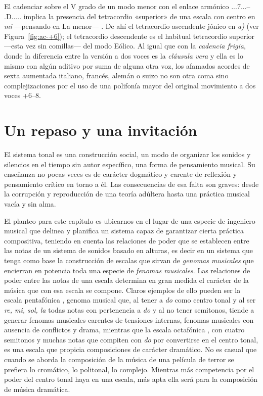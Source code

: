 \documentclass[a4paper,12pt]{article}
\begin{document}
\begin{multicols}{2}
El cadenciar sobre el V grado de un modo menor con el enlace armónico \acorde.\DD..7...-- \acorde.D..... implica la presencia del tetracordio «superior» de una escala con centro en \emph{mi} ---pensando en La menor--- . De ahí el tetracordio ascendente jónico en \emph{a)} (ver Figura~\ref{fig:ac-+6}); el tetracordio descendente  es el habitual tetracordio superior ---esta vez sin comillas--- del modo Eólico. Al igual que con la \emph{cadencia frigia}, donde la diferencia entre la versión a dos voces es la \emph{cláusula vera} y ella es lo mismo con algún aditivo por suma de alguna otra voz, los afamados acordes de sexta aumentada italiano, francés, alemán o suizo no son otra coma sino complejizaciones por el uso de una polifonía mayor del original movimiento a dos voces +6--8.

\section{Un repaso y una invitación}\label{sec:repaso-invitacion}
El sistema tonal es una construcción social, un modo de organizar los sonidos y silencios en el tiempo sin autor específico, una forma de pensamiento musical. Su enseñanza no pocas veces es de carácter dogmático y carente de reflexión y pensamiento crítico en torno a él. Las consecuencias de esa falta son graves: desde la corrupción y reproducción de una teoría adúltera hasta una práctica musical vacía y sin alma.

El planteo para este capítulo es ubicarnos en el lugar de una especie de ingeniero musical que delinea y planifica un sistema capaz de garantizar cierta práctica compositiva, teniendo en cuenta las relaciones de poder que se establecen entre las notas de un sistema de sonidos basado en alturas, es decir en un sistema que tenga como base la construcción de escalas que sirvan de \emph{genomas musicales} que encierran en potencia toda una especie de \emph{fenomas musicales}. Las relaciones de poder entre las notas de una escala determina en gran medida el carácter de la música que con esa escala se compone. Claros ejemplos de ello pueden ser la escala pentafónica \hbox{,} genoma musical que, al tener a \emph{do} como centro tonal y al ser \emph{re, mi, sol, la} todas notas con pertenencia a \emph{do} y al no tener semitonos, tiende a generar fenomas musicales carentes de tensiones internas, fenomas musicales con ausencia de conflictos y drama, mientras que la escala octafónica \hbox{,} con cuatro semitonos y muchas notas que compiten con \emph{do} por convertirse en el centro tonal, es una escala que propicia composiciones de carácter dramático. No es casual que cuando se aborda la composición de la música de una película de terror se prefiera lo cromático, lo politonal, lo complejo. Mientras más competencia por el poder del centro tonal haya en una escala, más apta ella será para la composición de música dramática.


\end{multicols}
\end{document}
